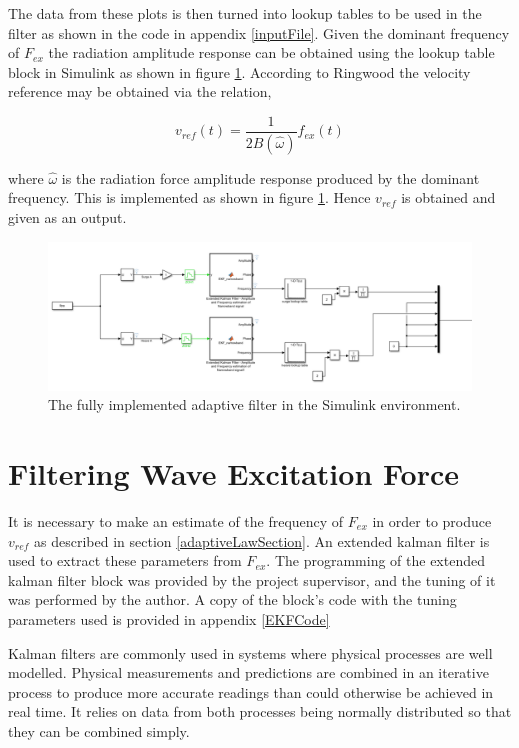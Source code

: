 \documentclass{report}
\begin{document}
The data from these plots is then turned into lookup tables to be used in the filter as shown in the code in appendix \ref{inputFile}. Given the dominant frequency of $F_{ex}$ the radiation amplitude response can be obtained using the lookup table block in Simulink as shown in figure \ref{adaptiveLawSimulink}. According to Ringwood\cite{ringwood} the velocity reference may be obtained via the relation,

\[
v_{ref}(t)=\frac{1}{2B(\hat{\omega})}f_{ex}(t)
\]

where $\hat{\omega}$ is the radiation force amplitude response produced by the dominant frequency. This is implemented as shown in figure \ref{adaptiveLawSimulink}. Hence $v_{ref}$ is obtained and given as an output.
 
\begin{figure}
\centering
\includegraphics[scale=0.5]{graphics/adaptiveLaw}
\caption{The fully implemented adaptive filter in the Simulink environment.}
\label{adaptiveLawSimulink}
\end{figure} 

\FloatBarrier
\section{Filtering Wave Excitation Force}
\label{EKF}
It is necessary to make an estimate of the frequency of $F_{ex}$ in order to produce $v_{ref}$ as described in section 
\ref{adaptiveLawSection}. An extended kalman filter is used to extract these parameters from $F_{ex}$. The programming of the extended kalman filter block was provided by the project supervisor, and the tuning of it was performed by the author. A copy of the block's code with the tuning parameters used is provided in appendix \ref{EKFCode}

Kalman filters are commonly used in systems where physical processes are well modelled. Physical measurements and predictions are combined in an iterative process to produce more accurate readings than could otherwise be achieved in real time. It relies on data from both processes being normally distributed so that they can be combined simply.
\end{document}
